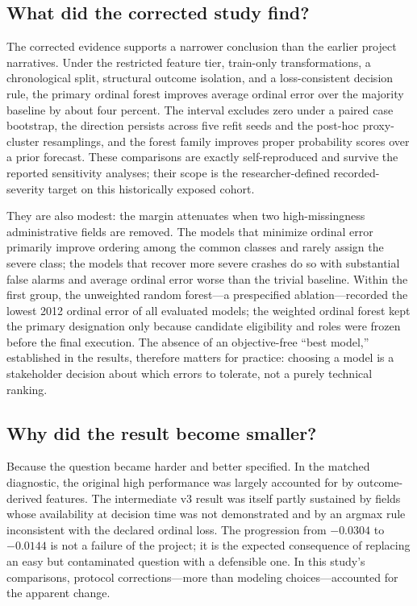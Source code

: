 \documentclass[11pt,letterpaper]{article}
\begin{document}
\subsection{What did the corrected study find?}
The corrected evidence supports a narrower conclusion than the earlier project narratives. Under the restricted feature tier, train-only transformations, a chronological split, structural outcome isolation, and a loss-consistent decision rule, the primary ordinal forest improves average ordinal error over the majority baseline by about four percent. The interval excludes zero under a paired case bootstrap, the direction persists across five refit seeds and the post-hoc proxy-cluster resamplings, and the forest family improves proper probability scores over a prior forecast. These comparisons are exactly self-reproduced and survive the reported sensitivity analyses; their scope is the researcher-defined recorded-severity target on this historically exposed cohort.

They are also modest: the margin attenuates when two high-missingness administrative fields are removed. The models that minimize ordinal error primarily improve ordering among the common classes and rarely assign the severe class; the models that recover more severe crashes do so with substantial false alarms and average ordinal error worse than the trivial baseline. Within the first group, the unweighted random forest---a prespecified ablation---recorded the lowest 2012 ordinal error of all evaluated models; the weighted ordinal forest kept the primary designation only because candidate eligibility and roles were frozen before the final execution. The absence of an objective-free ``best model,'' established in the results, therefore matters for practice: choosing a model is a stakeholder decision about which errors to tolerate, not a purely technical ranking.

\subsection{Why did the result become smaller?}
Because the question became harder and better specified. In the matched diagnostic, the original high performance was largely accounted for by outcome-derived features. The intermediate v3 result was itself partly sustained by fields whose availability at decision time was not demonstrated and by an argmax rule inconsistent with the declared ordinal loss. The progression from $-0.0304$ to $-0.0144$ is not a failure of the project; it is the expected consequence of replacing an easy but contaminated question with a defensible one. In this study's comparisons, protocol corrections---more than modeling choices---accounted for the apparent change.
\end{document}
